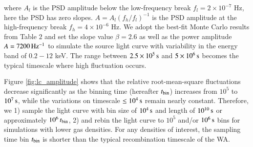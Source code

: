 \documentclass{aa}
\begin{document}
where $A_l$ is the PSD amplitude below the low-frequency break $f_l = 2 \times 10^{-7}$ Hz, here the PSD has zero slopes. 
$A = A_l(f_h/f_l)^{-1}$ is the PSD amplitude at the high-frequency break $f_h = 4 \times 10^{-6}$ Hz.
We adopt the best-fit Monte Carlo results from \cite{Markowitz2005ApJ} Table $2$ and set the slope value $\beta = 2.6$ as well as the power amplitude $A = 7200 \, \rm Hz^{-1}$ to simulate the source light curve with variability in the energy band of $0.2-12$ keV.
The range between $\rm 2.5 \times 10^5 \, s$ and $\rm 5 \times 10^6 \, s$ becomes the typical timescale where high fluctuation occurs.



Figure \ref{fig:lc_amplitude} shows that the relative root-mean-square fluctuations decrease significantly as the binning time (hereafter $t_{\rm bin}$) increases from $10^{5}$ to $ 10^{7} \rm \, s$, while the variations on timescale $\rm \leq 10^4 \, s$ remain nearly constant. 
Therefore, we 1) sample the light curve with bin size of $\rm 10^4 \, s$ and length of $\rm 10^{10} \, s$ or approximately $ 10^6 \, t_{\rm bin}$, 2) and rebin the light curve to $10^5$ and/or $10^6 \, \rm s$ bins for simulations with lower gas densities.
For any densities of interest, the sampling time bin $t_{\rm bin}$ is shorter than the typical recombination timescale of the WA.



\end{document}

